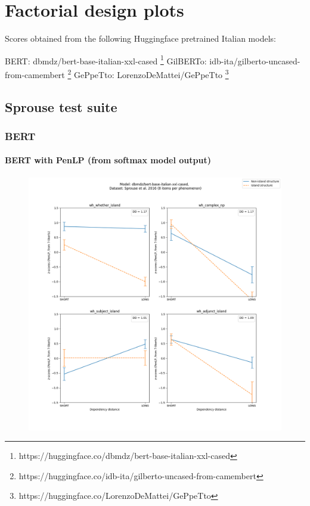 \chapter{Factorial design plots}

Scores obtained from the following Huggingface pretrained Italian models:

BERT: dbmdz/bert-base-italian-xxl-cased \footnote{https://huggingface.co/dbmdz/bert-base-italian-xxl-cased}
GilBERTo: idb-ita/gilberto-uncased-from-camembert \footnote{https://huggingface.co/idb-ita/gilberto-uncased-from-camembert}
GePpeTto: LorenzoDeMattei/GePpeTto \citep{de2020geppetto} \footnote{https://huggingface.co/LorenzoDeMattei/GePpeTto}

\clearpage
\section{Sprouse test suite}

\subsection{BERT}

\subsubsection{BERT with PenLP (from softmax model output)}
\begin{figure}[h]
	\centering
	\includegraphics[width=1\textwidth]{images/Chapter1/Sprouse_wh_dbmdz_bert-base-italian-xxl-cased_PenLP-zscores-likert-2022-07-11.png} 
\end{figure}

